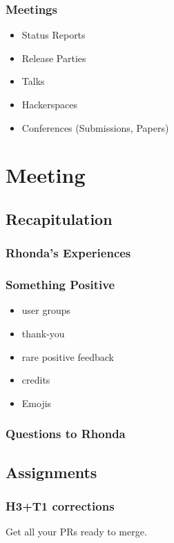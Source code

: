 \begin{frame}[<+-| alert@+>]
	\frametitle{Meetings}

	\begin{itemize}
		\item Status Reports
		\item Release Parties
		\item Talks
		\item Hackerspaces
		\item Conferences (Submissions, Papers)
	\end{itemize}
\end{frame}



\section{Meeting}

\subsection{Recapitulation}

\begin{frame}
	\frametitle{Rhonda's Experiences}
\end{frame}

\breakframe

\begin{frame}
	\frametitle{Something Positive}

	\pause

	\begin{itemize}[<+-| alert@+>]
		\item user groups
		\item thank-you
		\item rare positive feedback
		\item credits
		\item Emojis
	\end{itemize}
\end{frame}

\begin{frame}
	\frametitle{Questions to Rhonda}
\end{frame}

\subsection{Assignments}

\begin{frame}
	\frametitle{H3+T1 corrections}

	\begin{task}
	Get all your PRs ready to merge.
	\end{task}
\end{frame}


